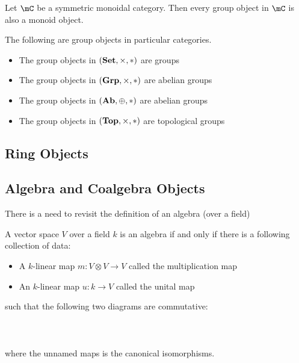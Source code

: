 \documentclass[a4paper]{article}
\begin{document}
\begin{lmm}{}{} Let $\mC$ be a symmetric monoidal category. Then every group object in $\mC$ is also a monoid object. 
\end{lmm}

\begin{thm}{}{} The following are group objects in particular categories. 
\begin{itemize}
\item The group objects in $(\bold{Set},\times,\ast)$ are groups
\item The group objects in $(\bold{Grp},\times,\ast)$ are abelian groups
\item The group objects in $(\bold{Ab},\oplus,\ast)$ are abelian groups
\item The group objects in $(\bold{Top},\times,\ast)$ are topological groups
\end{itemize}
\end{thm}

\subsection{Ring Objects}

\subsection{Algebra and Coalgebra Objects}
There is a need to revisit the definition of an algebra (over a field)

\begin{prp}{}{} A vector space $V$ over a field $k$ is an algebra if and only if there is a following collection of data: 
\begin{itemize}
\item A $k$-linear map $m:V\otimes V\to V$ called the multiplication map
\item An $k$-linear map $u:k\to V$ called the unital map
\end{itemize}
such that the following two diagrams are commutative: \\~\\
\\~\\
where the unnamed maps is the canonical isomorphisms. 
\end{prp}
\end{document}
